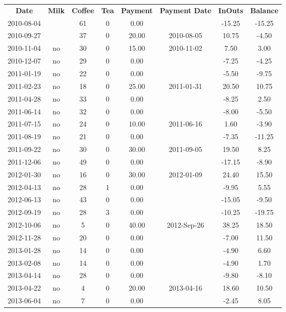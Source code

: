 \begin{center}
\begin{tabular}{cccccccc}
\textbf{Date} & \textbf{Milk} & \textbf{Coffee} & \textbf{Tea} & \textbf{Payment} & \textbf{Payment Date} & \textbf{InOuts} & \textbf{Balance} \\
2010-08-04 &  & 61 & 0 &  0.00 &  & -15.25 & -15.25\\ 
2010-09-27 &  & 37 & 0 & 20.00 & 2010-08-05 &  10.75 &  -4.50\\ 
2010-11-04 & no & 30 & 0 & 15.00 & 2010-11-02 &   7.50 &   3.00\\ 
2010-12-07 & no & 29 & 0 &  0.00 &  &  -7.25 &  -4.25\\ 
2011-01-19 & no & 22 & 0 &  0.00 &  &  -5.50 &  -9.75\\ 
2011-02-23 & no & 18 & 0 & 25.00 & 2011-01-31 &  20.50 &  10.75\\ 
2011-04-28 & no & 33 & 0 &  0.00 &  &  -8.25 &   2.50\\ 
2011-06-14 & no & 32 & 0 &  0.00 &  &  -8.00 &  -5.50\\ 
2011-07-15 & no & 24 & 0 & 10.00 & 2011-06-16 &   1.60 &  -3.90\\ 
2011-08-19 & no & 21 & 0 &  0.00 &  &  -7.35 & -11.25\\ 
2011-09-22 & no & 30 & 0 & 30.00 & 2011-09-05 &  19.50 &   8.25\\ 
2011-12-06 & no & 49 & 0 &  0.00 &  & -17.15 &  -8.90\\ 
2012-01-30 & no & 16 & 0 & 30.00 & 2012-01-09 &  24.40 &  15.50\\ 
2012-04-13 & no & 28 & 1 &  0.00 &  &  -9.95 &   5.55\\ 
2012-06-13 & no & 43 & 0 &  0.00 &  & -15.05 &  -9.50\\ 
2012-09-19 & no & 28 & 3 &  0.00 &  & -10.25 & -19.75\\ 
2012-10-06 & no &  5 & 0 & 40.00 & 2012-Sep-26 &  38.25 &  18.50\\ 
2012-11-28 & no & 20 & 0 &  0.00 &  &  -7.00 &  11.50\\ 
2013-01-28 & no & 14 & 0 &  0.00 &  &  -4.90 &   6.60\\ 
2013-02-08 & no & 14 & 0 &  0.00 &  &  -4.90 &   1.70\\ 
2013-04-14 & no & 28 & 0 &  0.00 &  &  -9.80 &  -8.10\\ 
2013-04-22 & no &  4 & 0 & 20.00 & 2013-04-16 &  18.60 &  10.50\\ 
2013-06-04 & no &  7 & 0 &  0.00 &  &  -2.45 &   8.05
\end{tabular}
\end{center}

